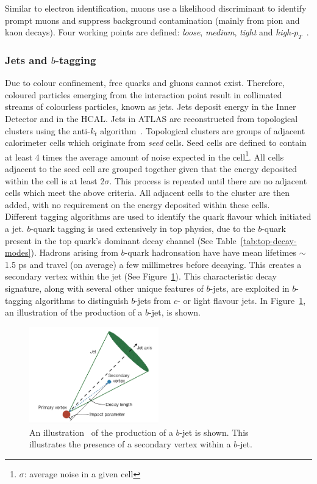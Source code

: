Similar to electron identification, muons use a likelihood discriminant to identify prompt muons and suppress background contamination (mainly from pion and kaon decays). Four working points are defined: \textit{loose}, \textit{medium}, \textit{tight} and \textit{high-$p_{T}$}~\cite{muonIDEfficiency}.

\subsubsection{Jets and $b$-tagging}
\label{sec:jets-btagging}
Due to colour confinement, free quarks and gluons cannot exist. Therefore, coloured particles emerging from the interaction point result in collimated streams of colourless particles, known as jets. Jets deposit energy in the Inner Detector and in the HCAL. Jets in ATLAS are reconstructed from topological clusters using the anti-$k_{t}$ algorithm~\cite{Cacciari:2008gp}. Topological clusters are groups of adjacent calorimeter cells which originate from \textit{seed} cells. Seed cells are defined to contain at least 4 times the average amount of noise expected in the cell\footnote{$\sigma$: average noise in a given cell}. All cells adjacent to the seed cell are grouped together given that the energy deposited within the cell is at least 2$\sigma$. This process is repeated until there are no adjacent cells which meet the above criteria. All adjacent cells to the cluster are then added, with no requirement on the energy deposited within these cells.\\

Different tagging algorithms are used to identify the quark flavour which initiated a jet. $b$-quark tagging is used extensively in top physics, due to the $b$-quark present in the top quark's dominant decay channel (See Table~\ref{tab:top-decay-modes}). Hadrons arising from $b$-quark hadronsation have have mean lifetimes $\sim$1.5 ps and travel (on average) a few millimetres before decaying. This creates a secondary vertex within the jet (See Figure~\ref{fig:btag-pic}). This characteristic decay signature, along with several other unique features of $b$-jets, are exploited in $b$-tagging algorithms to distinguish $b$-jets from $c$- or light flavour jets. In Figure~\ref{fig:btag-pic}, an illustration of the production of a $b$-jet, is shown.

\begin{figure}[h!]
 \includegraphics[width=0.5\textwidth]{figures/theoryFigs/b_tag_illustration.png}
 \centering
\caption{An illustration~\cite{Connelly2017PerformanceAC} of the production of a $b$-jet is shown. This illustrates the presence of a secondary vertex within a $b$-jet.}
\label{fig:btag-pic}
\end{figure}

